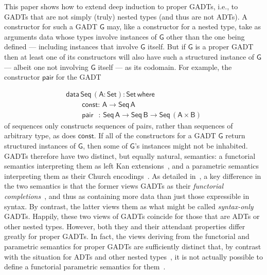 \documentclass[9pt]{entcs}
\begin{document}
This paper shows how to extend deep induction to proper GADTs, i.e.,
to GADTs that are not simply (truly) nested types (and thus are not
ADTs).  A constructor for such a GADT $\mathsf{G}$ may, like a
constructor for a nested type, take as arguments data whose types
involve instances of $\mathsf{G}$ other than the one being defined ---
including instances that involve $\mathsf{G}$ itself. But if
$\mathsf{G}$ is a proper GADT then at least one of its constructors
will also have such a structured instance of $\mathsf{G}$ --- albeit
one not involving $\mathsf{G}$ itself --- as its codomain.
For example, the constructor $\mathsf{pair}$ for the GADT 

\vspace*{-0.1in}

\begin{equation}\label{eq:seq}
\begin{array}{l}
\mathsf{data\, Seq\,(A : Set) : Set\,where}\\
\mathsf{\;\;\;\;\;\;\;\;const :\, A \to Seq\,A}\\
\mathsf{\;\;\;\;\;\;\;\;pair\;\;\, :\, Seq \,A \to Seq\,B \to
  Seq\,(A \times B)}
\end{array}
\end{equation}
\noindent
of sequences only constructs sequences of pairs, rather than sequences
of arbitrary type, as does $\mathsf{const}$. If all of the
constructors for a GADT $\mathsf{G}$ return structured instances of
$\mathsf{G}$, then some of $\mathsf{G}$'s instances might not be
inhabited. GADTs therefore have two distinct, but equally natural,
semantics: a functorial semantics interpreting them as left Kan
extensions~\cite{mac71}, and a parametric semantics interpreting them
as their Church encodings~\cite{atk12,vw10}. As detailed
in~\cite{jgj21}, a key difference in the two semantics is that the
former views GADTs as their {\em functorial completions}~\cite{jp19},
and thus as containing more data than just those expressible in
syntax. By contrast, the latter views them as what might be called
{\em syntax-only} GADTs. Happily, these two views of GADTs coincide
for those that are ADTs or other nested types. However, both they and
their attendant properties differ greatly for proper GADTs. In fact,
the views deriving from the functorial and parametric semantics for
proper GADTs are sufficiently distinct that, by contrast with the
situation for ADTs and other nested
types~\cite{bfss90,gjfor15,jgj21f}, it is not actually possible to
define a functorial parametric semantics for them~\cite{jgj21}.
\end{document}
